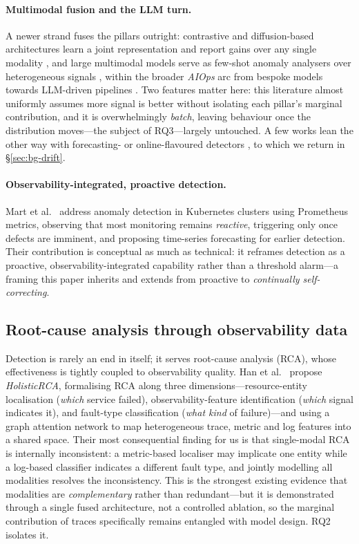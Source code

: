 \documentclass[pdflatex,sn-mathphys-num]{sn-jnl}%
\theoremstyle{thmstyleone}%
\theoremstyle{thmstyletwo}%
\theoremstyle{thmstylethree}%
\begin{document}
\paragraph{Multimodal fusion and the LLM turn.} A newer strand fuses the pillars outright: contrastive and diffusion-based architectures learn a joint representation and report gains over any single modality \cite{wang2025multimodal,zhang2026modify}, and large multimodal models serve as few-shot anomaly analysers over heterogeneous signals \cite{zhuang2024multimodal}, within the broader \emph{AIOps} arc from bespoke models towards LLM-driven pipelines \cite{zhang2024aiops}. Two features matter here: this literature almost uniformly assumes more signal is better without isolating each pillar's marginal contribution, and it is overwhelmingly \emph{batch}, leaving behaviour once the distribution moves---the subject of RQ3---largely untouched. A few works lean the other way with forecasting- or online-flavoured detectors \cite{xu2024forecasting,wette2024omlad}, to which we return in \S\ref{sec:bg-drift}.

\paragraph{Observability-integrated, proactive detection.} Mart et al.\ \cite{mart2020} address anomaly detection in Kubernetes clusters using Prometheus metrics, observing that most monitoring remains \emph{reactive}, triggering only once defects are imminent, and proposing time-series forecasting for earlier detection. Their contribution is conceptual as much as technical: it reframes detection as a proactive, observability-integrated capability rather than a threshold alarm---a framing this paper inherits and extends from proactive to \emph{continually self-correcting}.

\subsection{Root-cause analysis through observability data}\label{sec:bg-rca}

Detection is rarely an end in itself; it serves root-cause analysis (RCA), whose effectiveness is tightly coupled to observability quality. Han et al.\ \cite{han2024} propose \emph{HolisticRCA}, formalising RCA along three dimensions---resource-entity localisation (\emph{which} service failed), observability-feature identification (\emph{which} signal indicates it), and fault-type classification (\emph{what kind} of failure)---and using a graph attention network to map heterogeneous trace, metric and log features into a shared space. Their most consequential finding for us is that single-modal RCA is internally inconsistent: a metric-based localiser may implicate one entity while a log-based classifier indicates a different fault type, and jointly modelling all modalities resolves the inconsistency. This is the strongest existing evidence that modalities are \emph{complementary} rather than redundant---but it is demonstrated through a single fused architecture, not a controlled ablation, so the marginal contribution of traces specifically remains entangled with model design. RQ2 isolates it.
\end{document}
